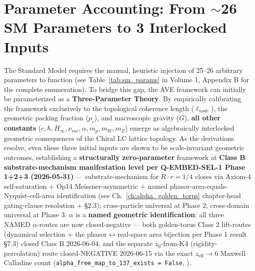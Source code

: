 \section{Parameter Accounting: From $\sim$26 SM Parameters to 3 Interlocked Inputs}
The Standard Model requires the manual, heuristic injection of 25--26 arbitrary parameters to function (see Table~\ref{tab:sm_params} in Volume 1, Appendix B for the complete enumeration). To bridge this gap, the AVE framework can initially be parameterized as a \textbf{Three-Parameter Theory}. By empirically calibrating the framework exclusively to the topological coherence length ($\ell_{node}$), the geometric packing fraction ($p_c$), and macroscopic gravity ($G$), \textbf{all other constants} ($c, \hbar, H_\infty, \nu_{vac}, \alpha, m_p, m_W, m_Z$) emerge as algebraically interlocked geometric consequences of the Chiral LC lattice topology. As the derivations resolve, even these three initial inputs are shown to be scale-invariant geometric outcomes, establishing a \textbf{structurally zero-parameter} framework at \textbf{Class B substrate-mechanism manifestation level per Q-EMBED-SEL-1 Phase 1+2+3 (2026-05-31)} --- substrate-mechanism for $R \cdot r = 1/4$ closes via Axiom-4 self-saturation $+$ Op14 Meissner-asymmetric $+$ named phasor-area-equals-Nyquist-cell-area identification (see Ch.~\ref{ch:alpha_golden_torus} chapter-head gating-clause resolution +  \S2.3); cross-particle universal at Phase 2; cross-domain universal at Phase 3. $\alpha$ is a \textbf{named geometric identification}: all three NAMED $\alpha$-routes are now closed-negative --- both golden-torus Class 2 lift-routes (dynamical selection $+$ the phasor$\leftrightarrow$real-space area bijection per Phase 1 result \S7.3) closed Class B 2026-06-04, and the separate $z_0$-from-K4 (rigidity-percolation) route closed-NEGATIVE 2026-06-15 via the exact $z_{\text{eff}} \to 6$ Maxwell--Calladine count (\texttt{alpha\_free\_map\_to\_137\_exists = False}, ). %
